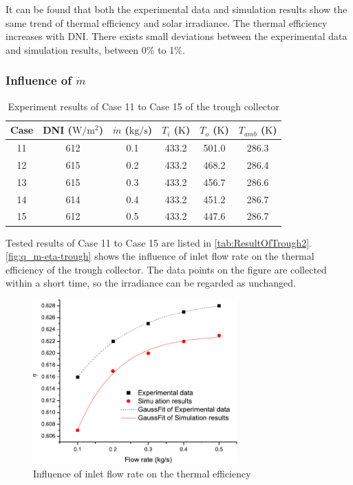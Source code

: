 It can be found that both the experimental data and simulation results show the same trend of thermal efficiency and solar irradiance.
The thermal efficiency increases with DNI.
There exists small deviations between the experimental data and simulation results, between 0\% to 1\%.

\subsubsection{Influence of $\dot{m}$}

\begin{table}[htbp]
	\caption{Experiment results of Case 11 to Case 15 of the trough collector}
	\centering
	\begin{tabular}{cccccc}
		\toprule
		Case	& DNI ($\mathrm{W/m^2}$)	&	$\dot{m}$ ($\mathrm{kg/s}$)			&	$T_i$ ($\mathrm{K}$)	&	$T_o$ ($\mathrm{K}$)		&	$T_{amb}$ ($\mathrm{K}$)\\
		\midrule
		11	&	612	&	0.1	&	433.2	&	501.0	&	286.3\\
		12	&	615	&	0.2	&	433.2	&	468.2	&	286.4\\
		13	&	615	&	0.3	&	433.2	&	456.7	&	286.6	\\
		14	&	614	&	0.4	&	433.2	&	451.2	&	286.7\\
		15	&	612	&	0.5	&	433.2	&	447.6	&	286.7\\
		\bottomrule
	\end{tabular}
	
	\label{tab:ResultOfTrough2}
\end{table}
Tested results of Case 11 to Case 15 are listed in \autoref{tab:ResultOfTrough2}.
\autoref{fig:q_m-eta-trough} shows the influence of inlet flow rate on the thermal efficiency of the trough collector. The data points on the figure are collected within a short time, so the irradiance can be regarded as unchanged.
\begin{figure}[!ht]
\centering
\includegraphics[width=0.7\textwidth]{fig/q_m-eta-trough}
\caption{Influence of inlet flow rate on the thermal efficiency}
\label{fig:q_m-eta-trough}
\end{figure}


